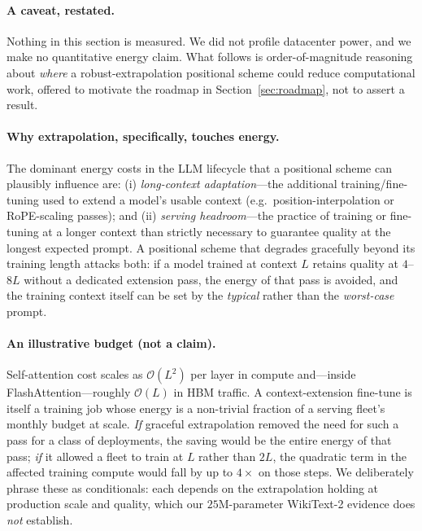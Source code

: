 \documentclass[11pt,a4paper]{article}
\begin{document}
\paragraph{A caveat, restated.} Nothing in this section is measured. We did not
profile datacenter power, and we make no quantitative energy claim. What follows
is order-of-magnitude reasoning about \emph{where} a robust-extrapolation
positional scheme could reduce computational work, offered to motivate the
roadmap in Section~\ref{sec:roadmap}, not to assert a result.

\paragraph{Why extrapolation, specifically, touches energy.} The dominant energy
costs in the LLM lifecycle that a positional scheme can plausibly influence are:
(i) \emph{long-context adaptation}---the additional training/fine-tuning used to
extend a model's usable context (e.g.\ position-interpolation or RoPE-scaling
passes); and (ii) \emph{serving headroom}---the practice of training or
fine-tuning at a longer context than strictly necessary to guarantee quality at
the longest expected prompt. A positional scheme that degrades gracefully beyond
its training length attacks both: if a model trained at context $L$ retains
quality at $4$--$8L$ without a dedicated extension pass, the energy of that pass
is avoided, and the training context itself can be set by the \emph{typical}
rather than the \emph{worst-case} prompt.

\paragraph{An illustrative budget (not a claim).} Self-attention cost scales as
$\mathcal{O}(L^2)$ per layer in compute and---inside FlashAttention---roughly
$\mathcal{O}(L)$ in HBM traffic. A context-extension fine-tune is itself a
training job whose energy is a non-trivial fraction of a serving fleet's monthly
budget at scale. \emph{If} graceful extrapolation removed the need for such a
pass for a class of deployments, the saving would be the entire energy of that
pass; \emph{if} it allowed a fleet to train at $L$ rather than $2L$, the
quadratic term in the affected training compute would fall by up to $4\times$ on
those steps. We deliberately phrase these as conditionals: each depends on the
extrapolation holding at production scale and quality, which our $25$M-parameter
WikiText-2 evidence does \emph{not} establish.
\end{document}
